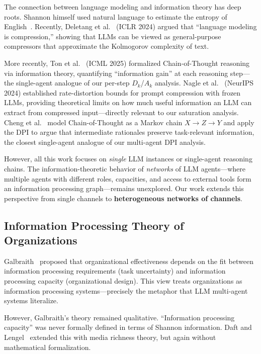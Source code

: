 \documentclass[conference]{IEEEtran}
\begin{document}
The connection between language modeling and information theory has deep roots.
Shannon himself used natural language to estimate the entropy of English~\cite{shannon1948}.
Recently, Deletang et al.~\cite{deletang2024compression} (ICLR 2024) argued that ``language modeling is compression,'' showing that LLMs can be viewed as general-purpose compressors that approximate the Kolmogorov complexity of text.

More recently, Ton et al.~\cite{ton2025cot} (ICML 2025) formalized Chain-of-Thought reasoning via information theory, quantifying ``information gain'' at each reasoning step---the single-agent analogue of our per-step $D_k$/$A_k$ analysis.
Nagle et al.~\cite{nagle2024ratedistortion} (NeurIPS 2024) established rate-distortion bounds for prompt compression with frozen LLMs, providing theoretical limits on how much useful information an LLM can extract from compressed input---directly relevant to our saturation analysis.
Cheng et al.~\cite{cheng2025mi} model Chain-of-Thought as a Markov chain $X \to Z \to Y$ and apply the DPI to argue that intermediate rationales preserve task-relevant information, the closest single-agent analogue of our multi-agent DPI analysis.

However, all this work focuses on \emph{single} LLM instances or single-agent reasoning chains.
The information-theoretic behavior of \emph{networks} of LLM agents---where multiple agents with different roles, capacities, and access to external tools form an information processing graph---remains unexplored.
Our work extends this perspective from single channels to \textbf{heterogeneous networks of channels}.

\subsection{Information Processing Theory of Organizations}

Galbraith~\cite{galbraith1974designing} proposed that organizational effectiveness depends on the fit between information processing requirements (task uncertainty) and information processing capacity (organizational design).
This view treats organizations as information processing systems---precisely the metaphor that LLM multi-agent systems literalize.

However, Galbraith's theory remained qualitative.
``Information processing capacity'' was never formally defined in terms of Shannon information.
Daft and Lengel~\cite{daft1986organizational} extended this with media richness theory, but again without mathematical formalization.
\end{document}
